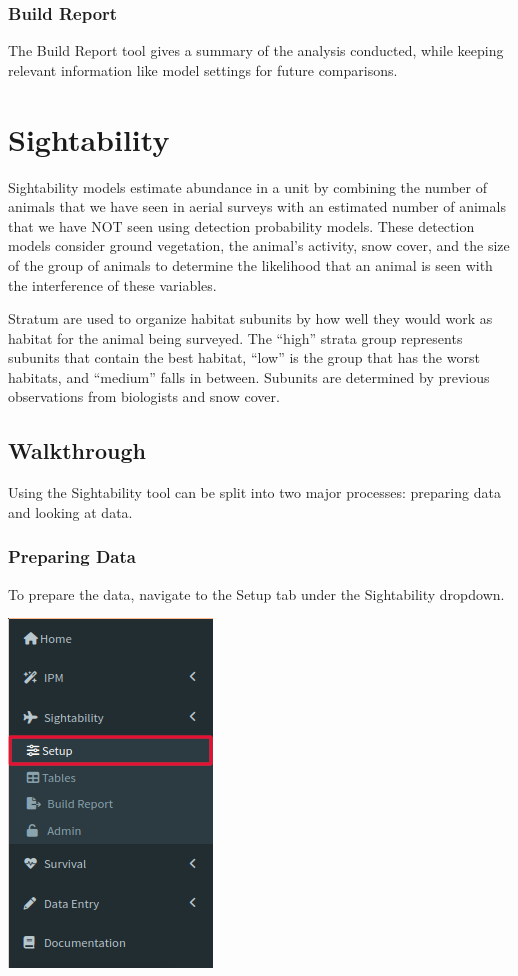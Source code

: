 \documentclass[
]{book}
\begin{document}
\hypertarget{ipm-report}{%
\subsection{Build Report}\label{ipm-report}}

The Build Report tool gives a summary of the analysis conducted, while keeping relevant information like model settings for future comparisons.

\hypertarget{sight}{%
\chapter{Sightability}\label{sight}}

Sightability models estimate abundance in a unit by combining the number of animals that we have seen in aerial surveys with an estimated number of animals that we have NOT seen using detection probability models. These detection models consider ground vegetation, the animal's activity, snow cover, and the size of the group of animals to determine the likelihood that an animal is seen with the interference of these variables.

Stratum are used to organize habitat subunits by how well they would work as habitat for the animal being surveyed. The ``high'' strata group represents subunits that contain the best habitat, ``low'' is the group that has the worst habitats, and ``medium'' falls in between. Subunits are determined by previous observations from biologists and snow cover.

\hypertarget{sight-walk}{%
\section{Walkthrough}\label{sight-walk}}

Using the Sightability tool can be split into two major processes: preparing data and looking at data.

\hypertarget{sight-prep}{%
\subsection{Preparing Data}\label{sight-prep}}

To prepare the data, navigate to the Setup tab under the Sightability dropdown.

\includegraphics{./www/sight_walk1.png}
\end{document}
